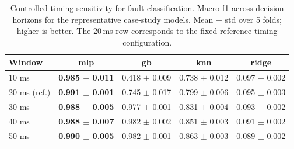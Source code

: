 \begin{table}[ht]
\caption{Controlled timing sensitivity for fault classification. Macro-\ac{f1} across decision horizons for the representative case-study models. Mean $\pm$ std over 5 folds; higher is better. The 20\,ms row corresponds to the fixed reference timing configuration.}
\small
\label{tab:fc_timing_sensitivity}
\centering
\begin{tabular}{lcccc}
\toprule
\bfseries Window & \bfseries \ac{mlp} & \bfseries \ac{gb} & \bfseries \ac{knn} & \bfseries \ac{ridge} \\
\midrule
10 ms & \textbf{0.985 $\pm$ 0.011} & 0.418 $\pm$ 0.009 & 0.738 $\pm$ 0.012 & 0.097 $\pm$ 0.002 \\
20 ms (ref.) & \textbf{0.991 $\pm$ 0.001} & 0.745 $\pm$ 0.017 & 0.799 $\pm$ 0.006 & 0.095 $\pm$ 0.003 \\
30 ms & \textbf{0.988 $\pm$ 0.005} & 0.977 $\pm$ 0.001 & 0.831 $\pm$ 0.004 & 0.093 $\pm$ 0.002 \\
40 ms & \textbf{0.988 $\pm$ 0.007} & 0.982 $\pm$ 0.002 & 0.851 $\pm$ 0.003 & 0.091 $\pm$ 0.002 \\
50 ms & \textbf{0.990 $\pm$ 0.005} & 0.982 $\pm$ 0.001 & 0.863 $\pm$ 0.003 & 0.089 $\pm$ 0.002 \\
\bottomrule
\end{tabular}
\end{table}
